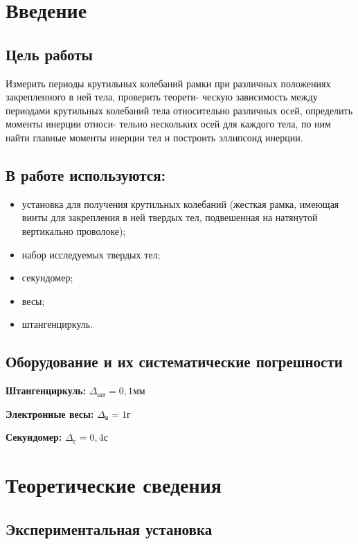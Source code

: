 \section{Введение}

\subsection{Цель работы}


    Измерить периоды крутильных колебаний рамки при различных положениях закрепленного в ней тела, проверить теорети- ческую зависимость между периодами крутильных колебаний тела относительно различных осей, определить моменты инерции относи- тельно нескольких осей для каждого тела, по ним найти главные моменты инерции тел и построить эллипсоид инерции.


\subsection{В работе используются:}

\begin{itemize}
    \item установка для получения крутильных
колебаний (жесткая рамка, имеющая винты для закрепления в ней твердых тел, подвешенная на натянутой вертикально проволоке);
    \item набор исследуемых твердых тел;
    \item секундомер;
    \item весы;
    \item штангенциркуль.
\end{itemize}

\subsection{Оборудование и их систематические погрешности}

\textbf{Штангенциркуль:} $ \Delta_\text{шт} = 0,1 \text{мм}$

\textbf{Электронные весы:} $ \Delta_\text{в} = 1 \text{г}$

\textbf{Секундомер:} $ \Delta_\text{с} = 0,4 \text{с}$


\section{Теоретические сведения}

\subsection{Экспериментальная установка}
	
